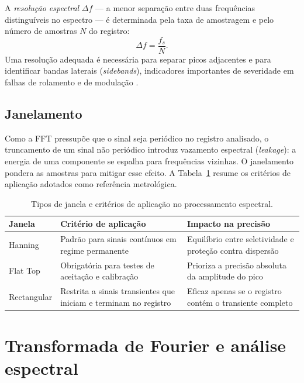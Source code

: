A \emph{resolução espectral} \(\Delta f\) --- a menor separação entre duas
frequências distinguíveis no espectro --- é determinada pela taxa de amostragem
e pelo número de amostras \(N\) do registro:
\begin{equation}
\label{eq:df}
  \Delta f = \frac{f_s}{N}.
\end{equation}
Uma resolução adequada é necessária para separar picos adjacentes e para
identificar bandas laterais (\emph{sidebands}), indicadores importantes de
severidade em falhas de rolamento e de modulação \cite{randall2011}.

\subsection{Janelamento}

Como a FFT pressupõe que o sinal seja periódico no registro analisado, o
truncamento de um sinal não periódico introduz vazamento espectral
(\emph{leakage}): a energia de uma componente se espalha para frequências
vizinhas. O janelamento pondera as amostras para mitigar esse efeito. A
Tabela~\ref{tab:janelas} resume os critérios de aplicação adotados como
referência metrológica.

\begin{table}[htbp]
\centering
\caption{Tipos de janela e critérios de aplicação no processamento espectral.}
\label{tab:janelas}
\begin{tabular}{@{}p{3cm}p{5.5cm}p{4.6cm}@{}}
\toprule
\textbf{Janela} & \textbf{Critério de aplicação} & \textbf{Impacto na precisão} \\
\midrule
Hanning   & Padrão para sinais contínuos em regime permanente & Equilíbrio entre seletividade e proteção contra dispersão \\
Flat Top  & Obrigatória para testes de aceitação e calibração & Prioriza a precisão absoluta da amplitude do pico \\
Rectangular & Restrita a sinais transientes que iniciam e terminam no registro & Eficaz apenas se o registro contém o transiente completo \\
\bottomrule
\end{tabular}
\par\vspace{2pt}{\footnotesize Fonte: diretrizes técnicas do projeto (docs/descricao.txt).}
\end{table}

\section{Transformada de Fourier e análise espectral}

